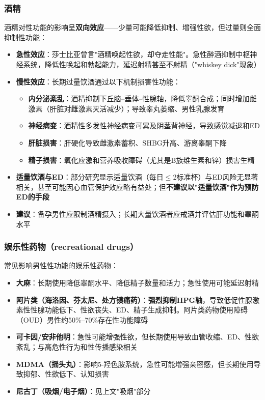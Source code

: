 \subsubsection{酒精}

酒精对性功能的影响呈\textbf{双向效应}——少量可能降低抑制、增强性欲，但过量则全面抑制性功能：

\begin{itemize}[leftmargin=2cm]
	\item \textbf{急性效应}：莎士比亚曾言"酒精唤起性欲，却夺走性能"。急性醉酒抑制中枢神经系统，降低性唤起和勃起能力，延迟射精甚至不射精（"whiskey dick"现象）
	\item \textbf{慢性效应}：长期过量饮酒通过以下机制损害性功能：
    \begin{itemize}
    	\item \textbf{内分泌紊乱}：酒精抑制下丘脑--垂体--性腺轴，降低睾酮合成；同时增加雌激素（肝脏对雌激素灭活减少）；导致睾丸萎缩、男性乳腺发育
    	\item \textbf{神经病变}：酒精性多发性神经病变可累及阴茎背神经，导致感觉减退和ED
    	\item \textbf{肝脏损害}：肝硬化导致雌激素蓄积、SHBG升高、游离睾酮下降
    	\item \textbf{精子损害}：氧化应激和营养吸收障碍（尤其是B族维生素和锌）损害生精
    \end{itemize}
	\item \textbf{适量饮酒与ED}：部分研究显示适量饮酒（每日$\le$2标准杯）与ED风险无显著相关，甚至可能因心血管保护效应略有益处；但\textbf{不建议以"适量饮酒"作为预防ED的手段}
	\item \textbf{建议}：备孕男性应限制酒精摄入；长期大量饮酒者应戒酒并评估肝功能和睾酮水平
\end{itemize}

\subsubsection{娱乐性药物（recreational drugs）}

常见影响男性性功能的娱乐性药物：

\begin{itemize}[leftmargin=2cm]
	\item \textbf{大麻}：长期使用降低睾酮水平、降低精子数量和活力；急性使用可能延迟射精
	\item \textbf{阿片类（海洛因、芬太尼、处方镇痛药）}：\textbf{强烈抑制HPG轴}，导致低促性腺激素性性腺功能低下、性欲丧失、ED、精子生成抑制。阿片类药物使用障碍（OUD）男性约50\%--70\%存在性功能障碍
	\item \textbf{可卡因/安非他明}：急性可能增强性欲，但长期使用导致血管收缩、ED、性欲紊乱；与高危性行为和性传播感染相关
	\item \textbf{MDMA（摇头丸）}：影响5-羟色胺系统，急性可能增强亲密感，但长期使用导致抑郁、性欲低下、认知损害
	\item \textbf{尼古丁（吸烟/电子烟）}：见上文"吸烟"部分
\end{itemize}

